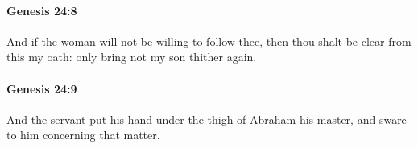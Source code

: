 		\paragraph{Genesis 24:8} %
			\label{GENESIS-24-8}

			And if the woman will not be willing to follow thee, then thou shalt be clear from this my oath: only bring not my son thither again.


		\paragraph{Genesis 24:9} %
			\label{GENESIS-24-9}

			And the servant put his hand under the thigh of Abraham his master, and sware to him concerning that matter.


